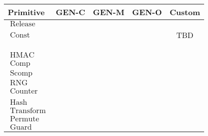 \documentclass[a4paper,twocolumn]{article}
\newcommand{\cm}{\checkmark}
\DeclareMathOperator{\hash}{Hash}
\DeclareMathOperator{\hmac}{HMAC}
\DeclareMathOperator{\encctr}{Enc_{ctr}}
\DeclareMathOperator{\decctr}{Dec_{ctr}}
\DeclareMathOperator{\rng}{RNG}
\DeclareMathOperator{\dhsec}{DH_{Sec}}
\DeclareMathOperator{\dhpub}{DH_{Pub}}
\DeclareMathOperator{\guard}{Guard}
\DeclareMathOperator{\release}{Release}
\DeclareMathOperator{\const}{Const}
\DeclareMathOperator{\permute}{Permute}
\DeclareMathOperator{\transform}{Transform}
\DeclareMathOperator{\comp}{Comp}
\DeclareMathOperator{\streamcomp}{Scomp}
\DeclareMathOperator{\counter}{Counter}
\newcommand{\geno}{GEN\mbox{-}O{}}
\newcommand{\genm}{GEN\mbox{-}M{}}
\newcommand{\genc}{GEN\mbox{-}C{}}
\begin{document}
\begin{tabular}{l|c|c|c|c} \hline
Primitive   & \genc{} & \genm{} & \geno{} & Custom \\\hline
$\release$    &         & \cm     &         &        \\ 
$\const$      &         &         &         & TBD    \\
$\dhsec$      &         & \cm     &         & \cm    \\
$\encctr$     &         & \cm     &         & \cm    \\
$\decctr$     &         & \cm     &         & \cm    \\
$\hmac$       &         & \cm     &         & \cm    \\
$\comp$       &         & \cm     & \cm     &        \\
$\streamcomp$ &         & \cm     & \cm     &        \\
$\rng$        &         & \cm     & \cm     &        \\
$\counter$    &         & \cm     & \cm     & \cm    \\
$\dhpub$      &         & \cm     & \cm     & \cm    \\
$\hash$       & \cm     & \cm     &         &        \\
$\transform$  & \cm     & \cm     &         &        \\
$\permute$    & \cm     & \cm     & \cm     &        \\
$\guard$      & \cm     & \cm     & \cm     & \cm    \\
\end{tabular}



\end{document}
